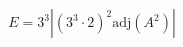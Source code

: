 \documentclass[preview]{standalone}
\begin{document}
\begin{align*}
E = 3^3 |(3^3 \cdot 2)^2 \text{adj}(A^2)|
\end{align*}
\end{document}
